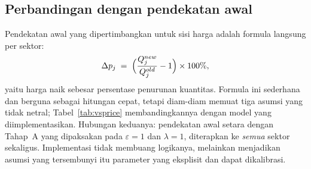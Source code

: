 \documentclass[11pt,a4paper]{article}
\begin{document}
\subsection{Perbandingan dengan pendekatan awal}

Pendekatan awal yang dipertimbangkan untuk sisi harga adalah formula
langsung per sektor:
\begin{equation}
\Delta p_j \;=\; \Bigl(\frac{Q^{new}_j}{Q^{old}_j} - 1\Bigr) \times 100\%,
\label{eq:naive}
\end{equation}
yaitu harga naik sebesar persentase penurunan kuantitas. Formula ini
sederhana dan berguna sebagai hitungan cepat, tetapi diam-diam memuat
tiga asumsi yang tidak netral; Tabel~\ref{tab:vsprice} membandingkannya
dengan model yang diimplementasikan. Hubungan keduanya: pendekatan awal
setara dengan Tahap~A yang dipaksakan pada $\varepsilon = 1$ dan
$\lambda = 1$, diterapkan ke \emph{semua} sektor sekaligus. Implementasi
tidak membuang logikanya, melainkan menjadikan asumsi yang tersembunyi
itu parameter yang eksplisit dan dapat dikalibrasi.
\end{document}
